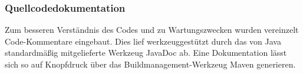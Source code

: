 \subsubsection{Quellcodedokumentation}
\label{sec:Quellcodedokumentation}
Zum besseren Verständnis des Codes und zu Wartungszwecken wurden vereinzelt Code-Kommentare eingebaut. Dies lief werkzeuggestützt durch das von Java standardmäßig mitgelieferte Werkzeug JavaDoc ab. Eine Dokumentation lässt sich so auf Knopfdruck über das Buildmanagement-Werkzeug Maven generieren.

